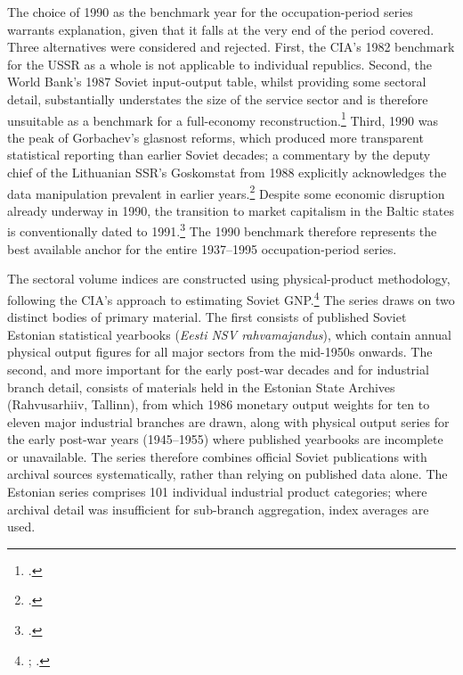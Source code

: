 \documentclass[12pt,a4paper]{article}
\begin{document}
The choice of 1990 as the benchmark year for the occupation-period series warrants explanation, given that it falls at the very end of the period covered. Three alternatives were considered and rejected. First, the CIA's 1982 benchmark for the USSR as a whole is not applicable to individual republics. Second, the World Bank's 1987 Soviet input-output table, whilst providing some sectoral detail, substantially understates the size of the service sector and is therefore unsuitable as a benchmark for a full-economy reconstruction.\footnote{\autocite{wbinputoutput1987}.} Third, 1990 was the peak of Gorbachev's glasnost reforms, which produced more transparent statistical reporting than earlier Soviet decades; a commentary by the deputy chief of the Lithuanian SSR's Goskomstat from 1988 explicitly acknowledges the data manipulation prevalent in earlier years.\footnote{\autocite{adlys1988}.} Despite some economic disruption already underway in 1990, the transition to market capitalism in the Baltic states is conventionally dated to 1991.\footnote{\autocite[457]{transition_progress}.} The 1990 benchmark therefore represents the best available anchor for the entire 1937--1995 occupation-period series.

The sectoral volume indices are constructed using physical-product methodology, following the CIA's approach to estimating Soviet GNP.\footnote{\autocite[48]{cia1982a}; \autocite[312]{maddison2010}.} The series draws on two distinct bodies of primary material. The first consists of published Soviet Estonian statistical yearbooks (\textit{Eesti NSV rahvamajandus}), which contain annual physical output figures for all major sectors from the mid-1950s onwards. The second, and more important for the early post-war decades and for industrial branch detail, consists of materials held in the Estonian State Archives (Rahvusarhiiv, Tallinn), from which 1986 monetary output weights for ten to eleven major industrial branches are drawn, along with physical output series for the early post-war years (1945--1955) where published yearbooks are incomplete or unavailable. The series therefore combines official Soviet publications with archival sources systematically, rather than relying on published data alone. The Estonian series comprises 101 individual industrial product categories; where archival detail was insufficient for sub-branch aggregation, index averages are used.
\end{document}
